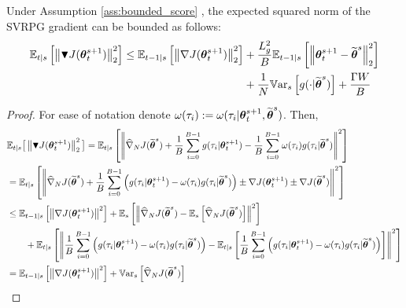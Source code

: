 \begin{lemma}\label{lemma:aux2}
	Under Assumption \ref{ass:bounded_score}
	, the expected squared norm of the \acs{SVRPG} gradient can be bounded as follows:
  \begin{align*}
	\Ets{\norm[2]{\gradBlack{\vtheta_t^{s+1}}}^2} \leq
	\Ets[t-1]{\norm[2]{\gradJ{\vtheta_t^{s+1}}}^2} 
	&+\frac{L_g^2}{B}\Ets[t-1]{\norm[2]{\vtheta_t^{s+1}-\wt{\vtheta}^s}^2}\\
	&+\frac{1}{N}\Vars{g(\cdot\vert\wt{\vtheta}^s)}
	\nonumber 
	+\frac{\Gamma\VARIS}{B}
	\end{align*}
\end{lemma}
\begin{proof}
	For ease of notation denote $\omega(\tau_i) := \omega(\tau_i|\vtheta^{s+1}_t, \wt{\vtheta}^{s})$. Then,
	\begingroup
	\allowdisplaybreaks
	\begin{align}
	&\mathbb{E}_{t|s}\big[\norm[2]{\gradBlack{\vtheta_t^{s+1}}}^2\big] = \Ets{\norm[]{\gradApp{\wt{\vtheta}^s}{N}
			+\frac{1}{B}\sum_{i=0}^{B-1} g(\tau_i\vert\vtheta_t^{s+1})
			-\frac{1}{B}\sum_{i=0}^{B-1}
			\omega(\tau_i)g(\tau_i\vert\wt{\vtheta}^s)}^2} \nonumber\\
	&= \mathbb{E}_{t\vert s}\left[\left\|\gradApp{\wt{\vtheta}^s}{N}
	+\frac{1}{B}\sum_{i=0}^{B-1}\left( 
	g(\tau_i\vert\vtheta_t^{s+1}) -
	\omega(\tau_i)g(\tau_i\vert\wt{\vtheta}^s)\right)
	\pm \gradJ{\vtheta_t^{s+1}} \pm \gradJ{\wt{\vtheta}^s} 
	\right\|^2\right] \nonumber\\
	&\leq \Ets[t-1]{\norm[]{\gradJ{\vtheta_t^{s+1}}}^2}
	+\Es{\norm[]{\gradApp{\wt{\vtheta}^s}{N} - \Es{\gradApp{\wt{\vtheta}^s}{N}}}^2} \nonumber\\
	&\qquad+ 
	\mathbb{E}_{t\vert s}\left[\left\|
	\frac{1}{B}\sum_{i=0}^{B-1}\left(
	g(\tau_i\vert\vtheta_t^{s+1}) -
	\omega(\tau_i)g(\tau_i\vert\wt{\vtheta}^s)\right)
	- \Ets{
		\frac{1}{B}\sum_{i=0}^{B-1}\left(
		g(\tau_i\vert\vtheta_t^{s+1}) -
		\omega(\tau_i)g(\tau_i\vert\wt{\vtheta}^s)\right)}\right\|^2\right] 
	\nonumber\\
	&= \Ets[t-1]{\norm[]{\gradJ{\vtheta_t^{s+1}}}^2}
	+\Vars{\gradApp{\wt{\vtheta}^s}{N}} \nonumber\\

\end{align}
\end{proof}
